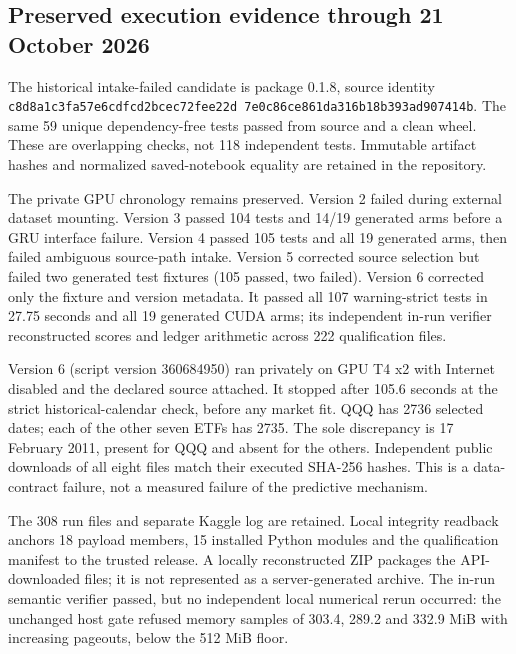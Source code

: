 \documentclass[11pt,a4paper]{article}
\begin{document}
\subsection{Preserved execution evidence through 21 October 2026}

The historical intake-failed candidate is package 0.1.8, source identity
\texttt{c8d8a1c3fa57e6cd\allowbreak fcd2bcec72fee22d\allowbreak
7e0c86ce861da316\allowbreak b18b393ad907414b}.
The same 59 unique dependency-free tests passed from source and a clean wheel.
These are overlapping checks, not 118 independent tests. Immutable artifact
hashes and normalized saved-notebook equality are retained in the repository.

The private GPU chronology remains preserved. Version 2 failed during external
dataset mounting. Version 3 passed 104 tests and 14/19 generated arms before a
GRU interface failure. Version 4 passed 105 tests and all 19 generated arms, then
failed ambiguous source-path intake. Version 5 corrected source selection but
failed two generated test fixtures (105 passed, two failed). Version 6 corrected
only the fixture and version metadata. It passed all 107 warning-strict tests in
27.75 seconds and all 19 generated CUDA arms; its independent in-run verifier
reconstructed scores and ledger arithmetic across 222 qualification files.

Version 6 (script version 360684950) ran privately on GPU T4 x2 with Internet
disabled and the declared source attached. It stopped after 105.6 seconds at the
strict historical-calendar check, before any market fit. QQQ has 2736 selected
dates; each of the other seven ETFs has 2735. The sole discrepancy is
17 February 2011, present for QQQ and absent for the others. Independent public
downloads of all eight files match their executed SHA-256 hashes. This is a
data-contract failure, not a measured failure of the predictive mechanism.

The 308 run files and separate Kaggle log are retained. Local integrity readback
anchors 18 payload members, 15 installed Python modules and the qualification
manifest to the trusted release. A locally reconstructed ZIP packages the
API-downloaded files; it is not represented as a server-generated archive.
The in-run semantic verifier passed, but no independent local numerical rerun
occurred: the unchanged host gate refused memory samples of 303.4, 289.2 and
332.9 MiB with increasing pageouts, below the 512 MiB floor.
\end{document}
